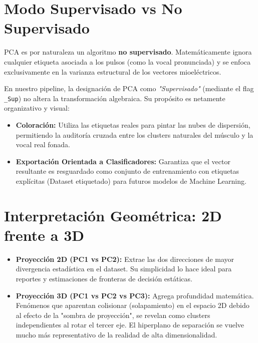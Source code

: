 \documentclass[12pt, a4paper]{article}
\begin{document}
\section{Modo Supervisado vs No Supervisado}

PCA es por naturaleza un algoritmo \textbf{no supervisado}. Matemáticamente ignora cualquier etiqueta asociada a los pulsos (como la vocal pronunciada) y se enfoca exclusivamente en la varianza estructural de los vectores mioeléctricos. 

En nuestro pipeline, la designación de PCA como \textit{"Supervisado"} (mediante el flag \texttt{\_Sup}) no altera la transformación algebraica. Su propósito es netamente organizativo y visual:
\begin{itemize}
    \item \textbf{Coloración:} Utiliza las etiquetas reales para pintar las nubes de dispersión, permitiendo la auditoría cruzada entre los clusters naturales del músculo y la vocal real fonada.
    \item \textbf{Exportación Orientada a Clasificadores:} Garantiza que el vector resultante es resguardado como conjunto de entrenamiento con etiquetas explícitas (Dataset etiquetado) para futuros modelos de Machine Learning.
\end{itemize}

\section{Interpretación Geométrica: 2D frente a 3D}

\begin{itemize}
    \item \textbf{Proyección 2D (PC1 vs PC2):} Extrae las dos direcciones de mayor divergencia estadística en el dataset. Su simplicidad lo hace ideal para reportes y estimaciones de fronteras de decisión estáticas.
    \item \textbf{Proyección 3D (PC1 vs PC2 vs PC3):} Agrega profundidad matemática. Fenómenos que aparentan colisionar (solapamiento) en el espacio 2D debido al efecto de la "sombra de proyección", se revelan como clusters independientes al rotar el tercer eje. El hiperplano de separación se vuelve mucho más representativo de la realidad de alta dimensionalidad.
\end{itemize}
\end{document}
